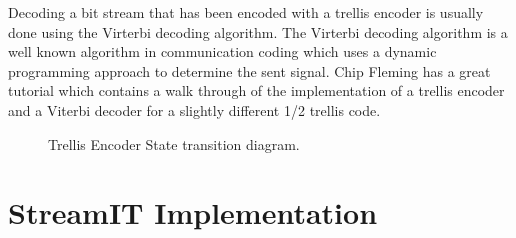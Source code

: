 \documentclass{article}
\begin{document}
Decoding a bit stream that has been encoded with a trellis encoder is usually
done using the Virterbi decoding algorithm. The Virterbi decoding algorithm
is a well known algorithm in communication coding which uses a dynamic programming
approach to determine the sent signal. Chip Fleming has a great 
tutorial\cite{fleming:tutorial} which contains a walk through of the implementation
of a trellis encoder and a Viterbi decoder for a slightly different 1/2 trellis code. 



\begin{figure}
\center
\epsfxsize=5.5in
\caption{Trellis Encoder State transition diagram.}
\label{fig:trellis-state-diagram}
\end{figure}



\section{StreamIT Implementation}



\begin{small}
\begin{singlespace}


\end{singlespace}
\end{small}
\end{document}
